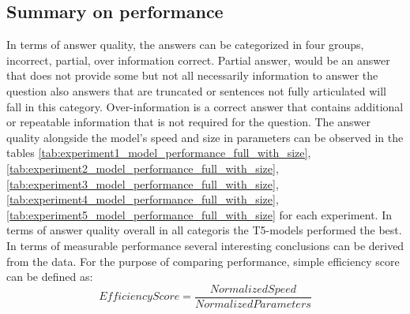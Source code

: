 \documentclass{wseas}
\begin{document}
\subsection{Summary on performance}
In terms of answer quality, the answers can be categorized in four groups, incorrect, partial, over information correct.
Partial answer, would be an answer that does not provide some but not all necessarily information to answer the question
also answers that are truncated or sentences not fully articulated will fall in this category. Over-information
is a correct answer that contains additional or repeatable information that is not required for the question. 
The answer quality alongside the model's speed and size in parameters can be observed in the tables 
\autoref{tab:experiment1_model_performance_full_with_size}, \autoref{tab:experiment2_model_performance_full_with_size}, 
\autoref{tab:experiment3_model_performance_full_with_size}, \autoref{tab:experiment4_model_performance_full_with_size},
\autoref{tab:experiment5_model_performance_full_with_size} for each experiment. In terms of answer quality overall in all categoris
the T5-models performed the best. In terms of measurable performance several interesting conclusions can be derived from the data. 
For the purpose of comparing performance, simple efficiency score can be defined as:
\begin{equation}
  Efficiency Score = \frac{Normalized Speed}{Normalized Parameters}
  \label{eq:efficiency_score}
\end{equation}
\end{document}
